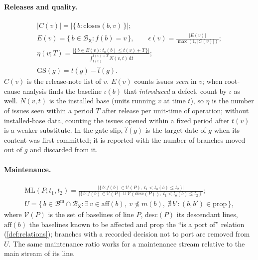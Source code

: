 \paragraph{Releases and quality.}
\begin{gather}
  |C(v)| = \bigl|\{\, b : \mathrm{closes}(b,v) \,\}\bigr| ;
  \label{eq:batch}\\
  E(v) = \{\, b \in \mathcal{B}_{\mathsf{X}} : f(b) = v \,\}, \qquad
  \epsilon(v) = \frac{|E(v)|}{\max(1,|C(v)|)} ;
  \label{eq:escaped}\\
  \eta(v;T) = \frac{\bigl|\{\, b \in E(v) : t_o(b) \le t(v) + T \,\}\bigr|}
    {\int_{t(v)}^{t(v)+T} N(v,t)\,\mathrm{d}t} ;
  \label{eq:exposure}\\
  \mathrm{GS}(g) = t(g) - \hat t(g) .
  \label{eq:gateslip}
\end{gather}
$C(v)$ is the release-note list of $v$. $E(v)$ counts issues \emph{seen}
in $v$; when root-cause analysis finds the baseline $\iota(b)$ that
\emph{introduced} a defect, count by $\iota$ as well. $N(v,t)$ is the
installed base (units running $v$ at time $t$), so $\eta$ is the number of
issues seen within a period $T$ after release per unit-time of operation;
without installed-base data, counting the issues opened within a fixed
period after $t(v)$ is a weaker substitute. In the gate slip, $\hat t(g)$
is the target date of $g$ when its content was first committed; it is
reported with the number of branches moved out of $g$ and discarded from
it.

\paragraph{Maintenance.}
\begin{gather}
  \mathrm{ML}(P;t_1,t_2) =
  \frac{\bigl|\{\, b : f(b)\in \mathcal{V}(P),\ t_1 < t_o(b) \le t_2 \,\}\bigr|}
       {\bigl|\{\, b : f(b)\in \mathcal{V}(P)\cup\mathcal{V}(\mathrm{desc}(P)),\ t_1 < t_o(b) \le t_2 \,\}\bigr|} ;
  \label{eq:maintload}\\
  U = \{\, b \in \mathcal{B}^{\mathrm{m}} \cap \mathcal{B}_{\mathsf{X}} :
    \exists\, v \in \mathrm{aff}(b),\ v \npreceq m(b),\
    \nexists\, b' : (b,b') \in \mathrm{prop} \,\} ,
  \label{eq:unprop}
\end{gather}
where $\mathcal{V}(P)$ is the set of baselines of line $P$,
$\mathrm{desc}(P)$ its descendant lines, $\mathrm{aff}(b)$ the baselines
known to be affected and $\mathrm{prop}$ the ``is a port of'' relation
(\cref{def:relations}); branches with a recorded decision not to port are
removed from $U$. The same maintenance ratio works for a maintenance
stream relative to the main stream of its line.

